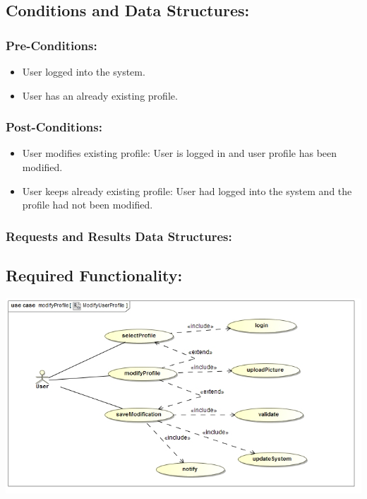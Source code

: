 \documentclass[a4paper,11pt]{article}
\begin{document}
\subsection{Conditions and Data Structures:}
\subsubsection*{Pre-Conditions:}
\begin{itemize}
\item User logged into the system. 
\item User has an already existing profile. 
\end{itemize}
\subsubsection*{Post-Conditions:}
\begin{itemize}
\item User modifies existing profile: User is logged in and user profile has been modified. 
\item User keeps already existing profile: User had logged into the system and the profile had not been modified. 
\end{itemize}
\subsubsection*{Requests and Results Data Structures:}
\subsection{Required Functionality:}
\includegraphics[width=1\linewidth]{./Images/UserProfile/ModifyUserProfileUseCase}
\end{document}
